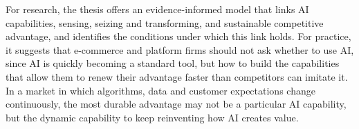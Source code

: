 For research, the thesis offers an evidence-informed model that links AI capabilities, sensing, seizing and transforming, and sustainable competitive advantage, and identifies the conditions under which this link holds. For practice, it suggests that e-commerce and platform firms should not ask whether to use AI, since AI is quickly becoming a standard tool, but how to build the capabilities that allow them to renew their advantage faster than competitors can imitate it. In a market in which algorithms, data and customer expectations change continuously, the most durable advantage may not be a particular AI capability, but the dynamic capability to keep reinventing how AI creates value.

